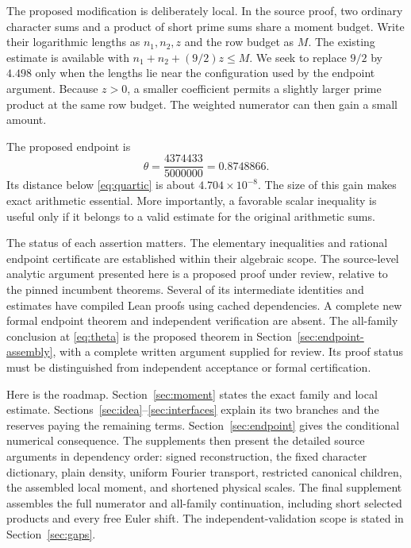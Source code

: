 \documentclass[11pt]{article}
\theoremstyle{definition}
\begin{document}
The proposed modification is deliberately local. In the source proof,
two ordinary character sums and a product of short prime sums share a
moment budget. Write their logarithmic lengths as $n_1,n_2,z$ and the
row budget as $M$. The existing estimate is available with
$n_1+n_2+(9/2)z\le M$. We seek to replace $9/2$ by $4.498$ only when
the lengths lie near the configuration used by the endpoint argument.
Because $z>0$, a smaller coefficient permits a slightly larger prime
product at the same row budget. The weighted numerator can then gain a
small amount.

The proposed endpoint is
\begin{equation}\label{eq:theta}
 \theta=\frac{4374433}{5000000}=0.8748866.
\end{equation}
Its distance below \eqref{eq:quartic} is about $4.704\times10^{-8}$.
The size of this gain makes exact arithmetic essential. More
importantly, a favorable scalar inequality is useful only if it belongs
to a valid estimate for the original arithmetic sums.

The status of each assertion matters. The elementary inequalities and
rational endpoint certificate are established within their algebraic
scope. The source-level analytic argument presented here is a proposed
proof under review, relative to the pinned incumbent theorems. Several of
its intermediate identities and estimates have compiled Lean proofs using
cached dependencies. A complete new formal endpoint theorem and independent
verification are absent. The all-family conclusion at
\eqref{eq:theta} is the proposed theorem in
Section~\ref{sec:endpoint-assembly}, with a complete written argument
supplied for review. Its proof status must be distinguished from
independent acceptance or formal certification.

Here is the roadmap. Section~\ref{sec:moment} states the exact family and
local estimate. Sections~\ref{sec:idea}--\ref{sec:interfaces} explain its two
branches and the reserves paying the remaining terms. Section~\ref{sec:endpoint}
gives the conditional numerical consequence. The supplements then present
the detailed source arguments in dependency order: signed reconstruction,
the fixed character dictionary, plain density, uniform Fourier transport,
restricted canonical children, the assembled local moment, and shortened
physical scales. The final supplement assembles the full numerator and
all-family continuation, including short selected products and every
free Euler shift. The independent-validation scope is stated in
Section~\ref{sec:gaps}.
\end{document}
